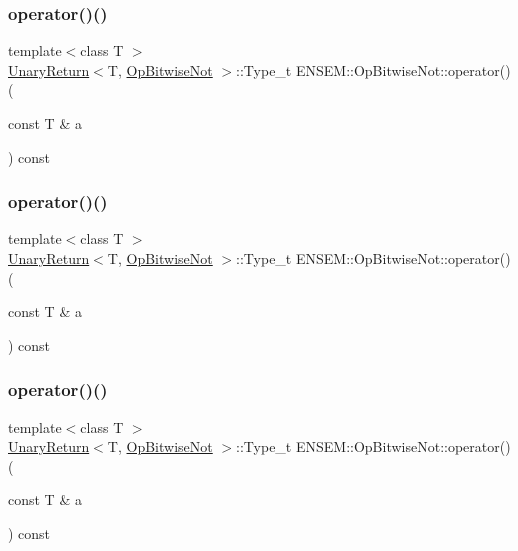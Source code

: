 \subsubsection{\texorpdfstring{operator()()}{operator()()}\hspace{0.1cm}{\footnotesize\ttfamily [1/3]}}
{\footnotesize\ttfamily template$<$class T $>$ \\
\mbox{\hyperlink{structENSEM_1_1UnaryReturn}{Unary\+Return}}$<$T, \mbox{\hyperlink{structENSEM_1_1OpBitwiseNot}{Op\+Bitwise\+Not}} $>$\+::Type\+\_\+t E\+N\+S\+E\+M\+::\+Op\+Bitwise\+Not\+::operator() (\begin{DoxyParamCaption}\item[{const T \&}]{a }\end{DoxyParamCaption}) const\hspace{0.3cm}{\ttfamily [inline]}}

\mbox{\label{structENSEM_1_1OpBitwiseNot_acfac2b63c37a3d1c576ba131caf869f6}} 
\subsubsection{\texorpdfstring{operator()()}{operator()()}\hspace{0.1cm}{\footnotesize\ttfamily [2/3]}}
{\footnotesize\ttfamily template$<$class T $>$ \\
\mbox{\hyperlink{structENSEM_1_1UnaryReturn}{Unary\+Return}}$<$T, \mbox{\hyperlink{structENSEM_1_1OpBitwiseNot}{Op\+Bitwise\+Not}} $>$\+::Type\+\_\+t E\+N\+S\+E\+M\+::\+Op\+Bitwise\+Not\+::operator() (\begin{DoxyParamCaption}\item[{const T \&}]{a }\end{DoxyParamCaption}) const\hspace{0.3cm}{\ttfamily [inline]}}

\mbox{\label{structENSEM_1_1OpBitwiseNot_acfac2b63c37a3d1c576ba131caf869f6}} 
\subsubsection{\texorpdfstring{operator()()}{operator()()}\hspace{0.1cm}{\footnotesize\ttfamily [3/3]}}
{\footnotesize\ttfamily template$<$class T $>$ \\
\mbox{\hyperlink{structENSEM_1_1UnaryReturn}{Unary\+Return}}$<$T, \mbox{\hyperlink{structENSEM_1_1OpBitwiseNot}{Op\+Bitwise\+Not}} $>$\+::Type\+\_\+t E\+N\+S\+E\+M\+::\+Op\+Bitwise\+Not\+::operator() (\begin{DoxyParamCaption}\item[{const T \&}]{a }\end{DoxyParamCaption}) const\hspace{0.3cm}{\ttfamily [inline]}}



